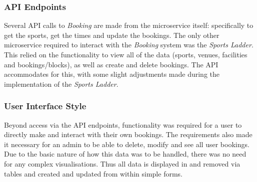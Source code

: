 \subsubsection{API Endpoints}
\par 
Several API calls to \textit{Booking} are made from the microservice itself: specifically to get the sports, get the times and update the bookings. The only other microservice required to interact with the \textit{Booking} system was the \textit{Sports Ladder}. This relied on the functionality to view all of the data (sports, venues, facilities and bookings/blocks), as well as create and delete bookings. The API accommodates for this, with some slight adjustments made during the implementation of the \textit{Sports Ladder}. 
\subsubsection{User Interface Style}
\par 
Beyond access via the API endpoints, functionality was required for a user to directly make and interact with their own bookings. The requirements also made it necessary for an admin to be able to delete, modify and see all user bookings. Due to the basic nature of how this data was to be handled, there was no need for any complex visualisations. Thus all data is displayed in and removed via tables and created and updated from within simple forms. 
